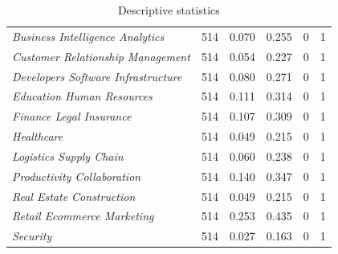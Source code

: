 \documentclass[12pt]{article}
\begin{document}
\begin{table} [ht]
\begin{tabularx}{\textwidth}{ p{4.9cm} p{1.6cm} p{1.6cm} p{1.6cm} p{1.6cm} p{1.6cm} }
\textit{Business Intelligence Analytics} & 514 & 0.070 & 0.255 & 0 & 1 \\
\textit{Customer Relationship Management} & 514 & 0.054 & 0.227 & 0 & 1 \\
\textit{Developers Software Infrastructure} & 514 & 0.080 & 0.271 & 0 & 1 \\
\textit{Education Human Resources} & 514 & 0.111 & 0.314 & 0 & 1 \\
\textit{Finance Legal Insurance} & 514 & 0.107 & 0.309 & 0 & 1 \\
\textit{Healthcare} & 514 & 0.049 & 0.215 & 0 & 1 \\
\textit{Logistics Supply Chain} & 514 & 0.060 & 0.238 & 0 & 1 \\
\textit{Productivity Collaboration} & 514 & 0.140 & 0.347 & 0 & 1 \\
\textit{Real Estate Construction} & 514 & 0.049 & 0.215 & 0 & 1 \\
\textit{Retail Ecommerce Marketing} & 514 & 0.253 & 0.435 & 0 & 1 \\
\textit{Security} & 514 & 0.027 & 0.163 & 0 & 1 \\
\end{tabularx}
\caption{Descriptive statistics}
\label{table2}
\end{table}
\end{document}
